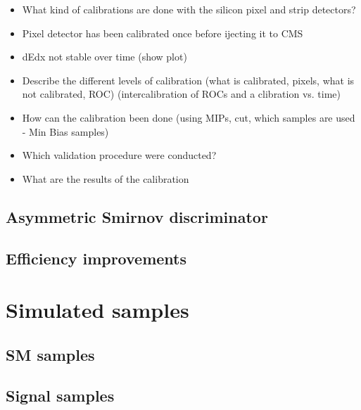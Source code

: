 \begin{itemize}
\item What kind of calibrations are done with the silicon pixel and strip detectors?
\item Pixel detector has been calibrated once before ijecting it to CMS
\item dEdx not stable over time (show plot)
\item Describe the different levels of calibration (what is calibrated, pixels, what is not calibrated, ROC) (intercalibration of ROCs and a clibration vs. time)
\item How can the calibration been done (using MIPs, \pt cut, which samples are used - Min Bias samples)
\item Which validation procedure were conducted?
\item What are the results of the calibration
\end{itemize}

\subsection{Asymmetric Smirnov discriminator}

\subsection{Efficiency improvements}
\section{Simulated samples}
\label{sec:SimulatedSamples}
\subsection{SM samples}
\subsection{Signal samples}
